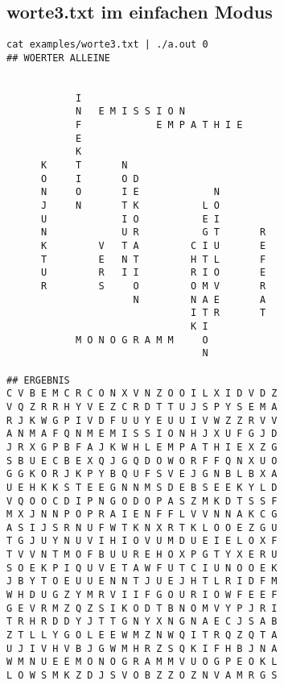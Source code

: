 \documentclass[a4paper,10pt,ngerman]{scrartcl}
\begin{document}
\subsection{worte3.txt im einfachen Modus}
\begin{lstlisting}
cat examples/worte3.txt | ./a.out 0
## WOERTER ALLEINE
                                               
                                               
            I                                  
            N   E M I S S I O N                
            F             E M P A T H I E      
            E                                  
            K                                  
      K     T       N                          
      O     I       O D                        
      N     O       I E             N          
      J     N       T K           L O          
      U             I O           E I          
      N             U R           G T       R  
      K         V   T A         C I U       E  
      T         E   N T         H T L       F  
      U         R   I I         R I O       E  
      R         S     O         O M V       R  
                      N         N A E       A  
                                I T R       T  
                                K I            
            M O N O G R A M M     O            
                                  N            

## ERGEBNIS
C V B E M C R C O N X V N Z O O I L X I D V D Z
V Q Z R R H Y V E Z C R D T T U J S P Y S E M A
R J K W G P I V D F U U Y E U U I V W Z Z R V V
A N M A F Q N M E M I S S I O N H J X U F G J D
J R X G P B F A J K W H L E M P A T H I E X Z G
S B U E C B E X Q J G Q D O W O R F F Q N X U O
G G K O R J K P Y B Q U F S V E J G N B L B X A
U E H K K S T E E G N N M S D E B S E E K Y L D
V Q O O C D I P N G O D O P A S Z M K D T S S F
M X J N N P O P R A I E N F F L V V N N A K C G
A S I J S R N U F W T K N X R T K L O O E Z G U
T G J U Y N U V I H I O V U M D U E I E L O X F
T V V N T M O F B U U R E H O X P G T Y X E R U
S O E K P I Q U V E T A W F U T C I U N O O E K
J B Y T O E U U E N N T J U E J H T L R I D F M
W H D U G Z Y M R V I I F G O U R I O W F E E F
G E V R M Z Q Z S I K O D T B N O M V Y P J R I
T R H R D D Y J T T G N Y X N G N A E C J S A B
Z T L L Y G O L E E W M Z N W Q I T R Q Z Q T A
U J I V H V B J G W M H R Z S Q K I F H B J N A
W M N U E E M O N O G R A M M V U O G P E O K L
L O W S M K Z D J S V O B Z Z O Z N V A M R G S
\end{lstlisting}
\end{document}
